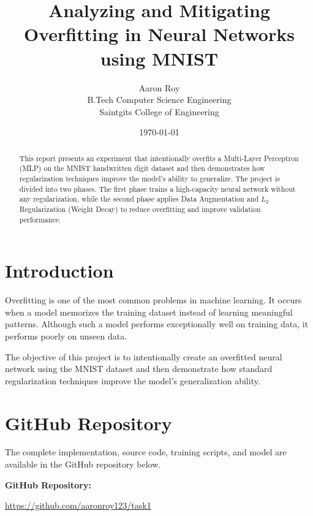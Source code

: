 \documentclass[12pt]{article}
\title{\textbf{
Analyzing and Mitigating Overfitting in Neural Networks using MNIST}}
\author{
Aaron Roy\\
B.Tech Computer Science Engineering\\
Saintgits College of Engineering
}
\date{\today}
\begin{document}
\maketitle

\tableofcontents

\newpage

\begin{abstract}
This report presents an experiment that intentionally overfits a Multi-Layer Perceptron (MLP) on the MNIST handwritten digit dataset and then demonstrates how regularization techniques improve the model's ability to generalize. The project is divided into two phases. The first phase trains a high-capacity neural network without any regularization, while the second phase applies Data Augmentation and $L_2$ Regularization (Weight Decay) to reduce overfitting and improve validation performance.
\end{abstract}

\newpage


\section{Introduction}

Overfitting is one of the most common problems in machine learning. It occurs when a model memorizes the training dataset instead of learning meaningful patterns. Although such a model performs exceptionally well on training data, it performs poorly on unseen data.

The objective of this project is to intentionally create an overfitted neural network using the MNIST dataset and then demonstrate how standard regularization techniques improve the model's generalization ability.


\section{GitHub Repository}

The complete implementation, source code, training scripts, and model are available in the GitHub repository below.

\bigskip

\textbf{GitHub Repository:}

\url{https://github.com/aaronroy123/task1}
\end{document}
